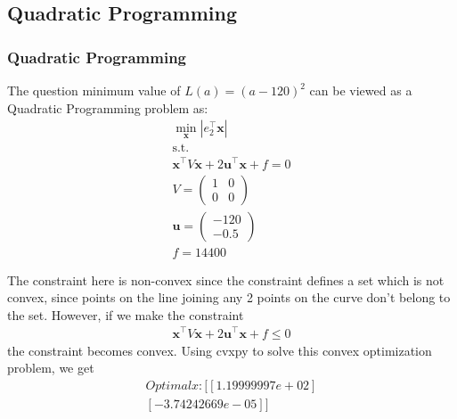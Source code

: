 \documentclass{beamer}
\providecommand{\brak}[1]{\ensuremath{\left(#1\right)}}
\theoremstyle{remark}
\providecommand{\abs}[1]{\left\vert#1\right\vert}
\newcommand{\myvec}[1]{\ensuremath{\begin{pmatrix}#1\end{pmatrix}}}
\let\vec\mathbf
\numberwithin{equation}{section}
\begin{document}
\subsection{Quadratic Programming}
\begin{frame}
\frametitle{Quadratic Programming}
The question minimum value of $L\brak{a} = \brak{a-120}^2$ can be viewed as a Quadratic Programming problem as:\\
\begin{align}
    \min_{\vec{x}} \abs{e_2^{\top}\vec{x}}\\
    \text{s.t. } \\ \vec{x}^{\top}V\vec{x} + 2\vec{u}^{\top}\vec{x} + f = 0\\
    V = \myvec{1 & 0 \\ 0 & 0}\\
    \vec{u} = \myvec{-120 \\ -0.5}\\
    f = 14400
\end{align}
\end{frame}
\begin{frame}
The constraint here is non-convex since the constraint defines a set which is not convex, since points on the
line joining any 2 points on the curve don't belong to the set. However, if we make the constraint
\begin{align}
    \vec{x}^{\top}V\vec{x} + 2\vec{u}^{\top}\vec{x} + f\le 0
\end{align}
the constraint becomes convex. Using cvxpy to solve this convex optimization problem, we get \\
\begin{align}
    Optimal x: [[ 1.19999997e+02]\\
 [-3.74242669e-05]]
\end{align}
\end{frame}
\end{document}
